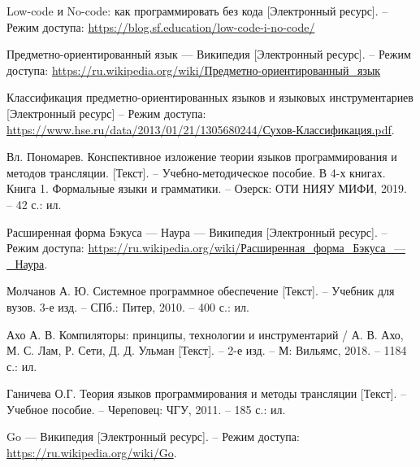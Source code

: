 \newpage


\begin{references}
	
	\item\label{ref:nolowcode} Low-code и No-code: как программировать без кода [Электронный ресурс]. --
	Режим доступа: \url{https://blog.sf.education/low-code-i-no-code/}
	
	\item\label{ref:dsl} Предметно-ориентированный язык — Википедия [Электронный ресурс]. --
	Режим доступа: \url{https://ru.wikipedia.org/wiki/Предметно-ориентированный_язык}
	
	\item\label{ref:dsl_classification} Классификация предметно-ориентированных языков и языковых инструментариев [Электронный ресурс] --
	Режим доступа: \url{https://www.hse.ru/data/2013/01/21/1305680244/Сухов-Классификация.pdf}.

	\item\label{ref:grammar} Вл. Пономарев. Конспективное изложение теории языков программирования и методов трансляции.
	[Текст]. -- Учебно-методическое пособие. В 4-х книгах. Книга 1.
	Формальные языки и грамматики. -- Озерск: ОТИ НИЯУ МИФИ, 2019. -- 42 с.: ил.

	\item\label{ref:rbnf} Расширенная форма Бэкуса — Наура — Википедия [Электронный ресурс]. --
	Режим доступа: \url{https://ru.wikipedia.org/wiki/Расширенная_форма_Бэкуса_—_Наура}.

	\item\label{ref:lexlem} Молчанов А. Ю. Системное программное обеспечение
	[Текст]. -- Учебник для вузов. 3-е изд. -- СПб.: Питер, 2010. -- 400 с.: ил.

	\item\label{ref:dragon} Ахо А. В. Компиляторы: принципы, технологии и инструментарий / А. В. Ахо, М. С. Лам, Р. Сети, Д. Д. Ульман
	[Текст]. -- 2-е изд. -- М: Вильямс, 2018. -- 1184 с.: ил.

	\item\label{ref:ganicheva} Ганичева О.Г. Теория языков программирования и методы трансляции
	[Текст]. -- Учебное пособие. -- Череповец: ЧГУ, 2011. -- 185 с.: ил.

	\item\label{ref:golang} Go — Википедия [Электронный ресурс]. --
	Режим доступа: \url{https://ru.wikipedia.org/wiki/Go}.


\end{references}
